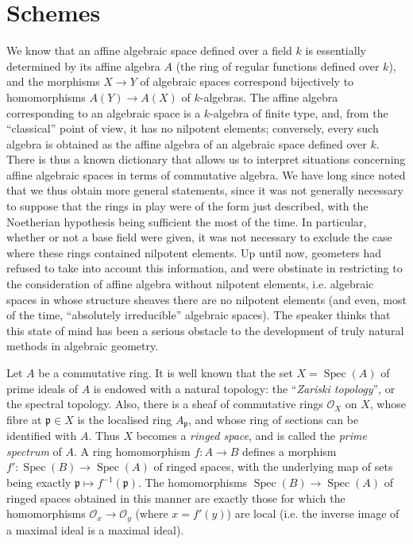 \documentclass{article}
\newcommand{\scr}[1]{{\mathscr{#1}}}
\newcommand{\fk}{\mathfrak}
\DeclareMathOperator{\Spec}{Spec}
\newcommand{\oldpage}[1]{\marginpar{\footnotesize$\Big\vert$ \textit{p.~#1}}}
\begin{document}
\section{Schemes}
\label{section1}

\oldpage{182-01}
We know that an affine algebraic space defined over a field $k$ is essentially determined by its affine algebra $A$ (the ring of regular functions defined over $k$), and the morphisms $X\to Y$ of algebraic spaces correspond bijectively to homomorphisms $A(Y)\to A(X)$ of $k$-algebras.
The affine algebra corresponding to an algebraic space is a $k$-algebra of finite type, and, from the ``classical'' point of view, it has no nilpotent elements;
conversely, every such algebra is obtained as the affine algebra of an algebraic space defined over $k$.
There is thus a known dictionary that allows us to interpret situations concerning affine algebraic spaces in terms of commutative algebra.
We have long since noted that we thus obtain more general statements, since it was not generally necessary to suppose that the rings in play were of the form just described, with the Noetherian hypothesis being sufficient the most of the time.
In particular, whether or not a base field were given, it was not necessary to exclude the case where these rings contained nilpotent elements.
Up until now, geometers had refused to take into account this information, and were obstinate in restricting to the consideration of affine algebra without nilpotent elements, i.e. algebraic spaces in whose structure sheaves there are no nilpotent elements (and even, most of the time, ``absolutely irreducible'' algebraic spaces).
The speaker thinks that this state of mind has been a serious obstacle to the development of truly natural methods in algebraic geometry.

Let $A$ be a commutative ring.
It is well known that the set $X=\Spec(A)$ of prime ideals of $A$ is endowed with a natural topology: the ``\emph{Zariski topology}'', or the spectral topology.
Also, there is a sheaf of commutative rings $\scr{O}_X$ on $X$, whose fibre at $\fk{p}\in X$ is the localised ring $A_\fk{p}$, and whose ring of sections can be identified with $A$.
Thus $X$ becomes a \emph{ringed space}, and is called the \emph{prime spectrum} of $A$.
A ring homomorphism $f\colon A\to B$ defines a morphism $f'\colon\Spec(B)\to\Spec(A)$ of ringed spaces, with the underlying map of sets being exactly $\fk{p}\mapsto f^{-1}(\fk{p})$.
The homomorphisms
\oldpage{182-02}
$\Spec(B)\to\Spec(A)$ of ringed spaces obtained in this manner are exactly those for which the homomorphisms $\scr{O}_x\to\scr{O}_y$ (where $x=f'(y)$) are local (i.e. the inverse image of a maximal ideal is a maximal ideal).
\end{document}
